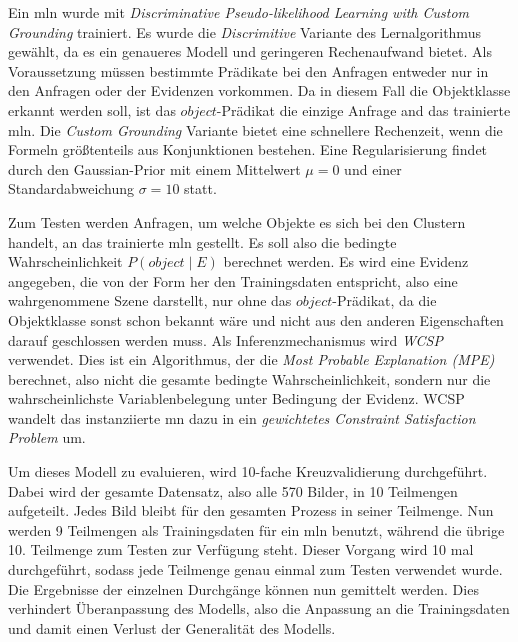 Ein \gls{mln} wurde mit \textit{Discriminative Pseudo-likelihood Learning with Custom Grounding}   trainiert. Es wurde die \textit{Discrimitive} Variante des Lernalgorithmus gewählt, da es ein genaueres Modell und geringeren Rechenaufwand bietet. Als Voraussetzung müssen bestimmte Prädikate bei den Anfragen entweder nur in den Anfragen oder der Evidenzen vorkommen. Da in diesem Fall die Objektklasse erkannt werden soll, ist das $object$-Prädikat die einzige Anfrage and das trainierte \gls{mln}. Die \textit{Custom Grounding} Variante bietet eine schnellere Rechenzeit, wenn die Formeln größtenteils aus Konjunktionen bestehen. Eine Regularisierung findet durch den Gaussian-Prior mit einem Mittelwert $\mu = 0$ und einer Standardabweichung $\sigma = 10$ statt. \par   

Zum Testen werden Anfragen, um welche Objekte es sich bei den Clustern handelt, an das trainierte \gls{mln} gestellt. Es soll also die bedingte Wahrscheinlichkeit $P(object \mid E)$ berechnet werden. Es wird eine Evidenz angegeben, die von der Form her den Trainingsdaten entspricht, also eine wahrgenommene Szene darstellt, nur ohne das $object$-Prädikat, da die Objektklasse sonst schon bekannt wäre und nicht aus den anderen Eigenschaften darauf geschlossen werden muss. Als Inferenzmechanismus wird \textit{WCSP} verwendet. Dies ist ein Algorithmus, der die \textit{Most Probable Explanation (MPE)} berechnet, also nicht die gesamte bedingte Wahrscheinlichkeit, sondern nur die wahrscheinlichste Variablenbelegung unter Bedingung der Evidenz. WCSP wandelt das instanziierte \gls{mn} dazu in ein \textit{gewichtetes Constraint Satisfaction Problem} um. \par

Um dieses Modell zu evaluieren, wird 10-fache Kreuzvalidierung durchgeführt. Dabei wird der gesamte Datensatz, also alle 570 Bilder, in 10 Teilmengen aufgeteilt. Jedes Bild bleibt für den gesamten Prozess in seiner Teilmenge. Nun werden 9 Teilmengen als Trainingsdaten für ein \gls{mln} benutzt, während die übrige 10. Teilmenge zum Testen zur Verfügung steht. Dieser Vorgang wird 10 mal durchgeführt, sodass jede Teilmenge genau einmal zum Testen verwendet wurde. Die Ergebnisse der einzelnen Durchgänge können nun gemittelt werden. Dies verhindert Überanpassung des Modells, also die Anpassung an die Trainingsdaten und damit einen Verlust der Generalität des Modells. \par

